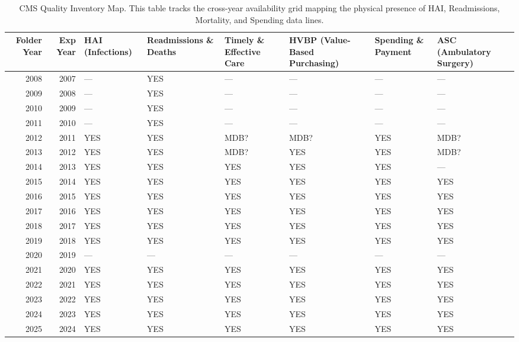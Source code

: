 \begin{table}[htbp]
\caption{CMS Quality Inventory Map. This table tracks the cross-year availability grid mapping the physical presence of HAI, Readmissions, Mortality, and Spending data lines.}
\label{tab:quality_inventory}
\begin{tabular}{rrllllll}
\toprule
\rowcolor{gray!10}
Folder Year & Exp Year & HAI (Infections) & Readmissions \& Deaths & Timely \& Effective Care & HVBP (Value-Based Purchasing) & Spending \& Payment & ASC (Ambulatory Surgery) \\
\midrule
2008 & 2007 & --- & YES & --- & --- & --- & --- \\
2009 & 2008 & --- & YES & --- & --- & --- & --- \\
2010 & 2009 & --- & YES & --- & --- & --- & --- \\
2011 & 2010 & --- & YES & --- & --- & --- & --- \\
2012 & 2011 & YES & YES & MDB? & MDB? & YES & MDB? \\
2013 & 2012 & YES & YES & MDB? & YES & YES & MDB? \\
2014 & 2013 & YES & YES & YES & YES & YES & --- \\
2015 & 2014 & YES & YES & YES & YES & YES & YES \\
2016 & 2015 & YES & YES & YES & YES & YES & YES \\
2017 & 2016 & YES & YES & YES & YES & YES & YES \\
2018 & 2017 & YES & YES & YES & YES & YES & YES \\
2019 & 2018 & YES & YES & YES & YES & YES & YES \\
2020 & 2019 & --- & --- & --- & --- & --- & --- \\
2021 & 2020 & YES & YES & YES & YES & YES & YES \\
2022 & 2021 & YES & YES & YES & YES & YES & YES \\
2023 & 2022 & YES & YES & YES & YES & YES & YES \\
2024 & 2023 & YES & YES & YES & YES & YES & YES \\
2025 & 2024 & YES & YES & YES & YES & YES & YES \\
\bottomrule
\end{tabular}
\end{table}
